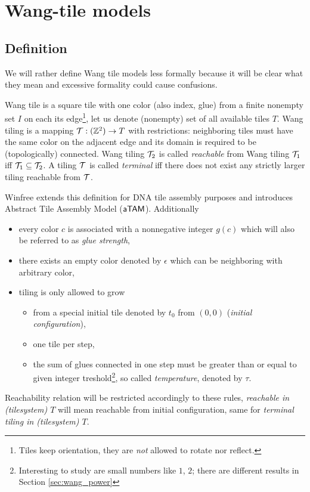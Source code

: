 
\section{Wang-tile models}

\subsection{Definition}
	
	
	We will rather define Wang tile models less formally because it will be clear what they mean and excessive formality could cause confusions.
	
	Wang tile is a square tile with one color (also index, glue) from a finite nonempty set $I$ on each its edge\footnote{Tiles keep orientation, they are {\em not} allowed to rotate nor reflect.}, let us denote (nonempty) set of all available tiles $T$. Wang tiling is a mapping ${\cal T}: (\mathbb{Z}^2) \rightarrow T$ with restrictions: neighboring tiles must have the same color on the adjacent edge and its domain is required to be (topologically) connected. Wang tiling ${\cal T}_2$ is called {\em reachable} from Wang tiling ${\cal T}_1$ iff ${\cal T}_1 \subseteq {\cal T}_2$. A tiling $\cal T$ is called {\em terminal} iff there does not exist any strictly larger tiling reachable from $\cal T$. %
	
	Winfree extends this definition for DNA tile assembly purposes and introduces Abstract Tile Assembly Model ($\mathsf{aTAM}$). Additionally
	\begin{itemize}
		\item every color $c$ is associated with a nonnegative integer $g(c)$ which will also be referred to as {\em glue strength},
		\item there exists an empty color denoted by $\epsilon$ which can be neighboring with arbitrary color,
		\item tiling is only allowed to grow
		\begin{itemize}
			\item from a special initial tile denoted by $t_0$ from $(0,0)$ ({\em initial configuration}),
			\item one tile per step,
			\item the sum of glues connected in one step must be greater than or equal to given integer treshold\footnote{Interesting to study are small numbers like $1$, $2$; there are different results in Section \ref{sec:wang_power}}, so called {\em temperature}, denoted by $\tau$.
		\end{itemize}
	\end{itemize}
	Reachability relation will be restricted accordingly to these rules, {\em reachable in (tilesystem) $T$} will mean reachable from initial configuration, same for {\em terminal tiling in (tilesystem) $T$}.
	
